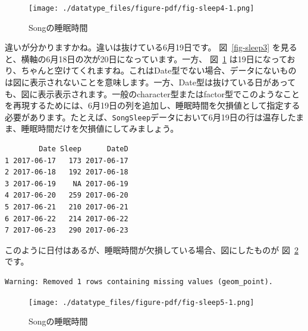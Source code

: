 \documentclass[
  a4paper,
  pandoc,
  ja=standard,
  jafont=haranoaji]{bxjsbook}
\newenvironment{Shaded}{\begin{snugshade}}{\end{snugshade}}
\newcommand{\ConstantTok}[1]{\textcolor[rgb]{0.56,0.35,0.01}{#1}}
\newcommand{\NormalTok}[1]{\textcolor[rgb]{0.00,0.48,0.65}{#1}}
\newcommand{\OtherTok}[1]{\textcolor[rgb]{0.00,0.48,0.65}{#1}}
\newcommand{\SpecialCharTok}[1]{\textcolor[rgb]{0.37,0.37,0.37}{#1}}
\newcommand{\StringTok}[1]{\textcolor[rgb]{0.13,0.47,0.30}{#1}}
\begin{document}
\begin{figure}

{\centering \texttt{[image: ./datatype\_files/figure-pdf/fig-sleep4-1.png]}

}

\caption{\label{fig-sleep4}Songの睡眠時間}

\end{figure}

違いが分かりますかね。違いは抜けている6月19日です。 図~\ref{fig-sleep3}
を見ると、横軸の6月18日の次が20日になっています。一方、
図~\ref{fig-sleep4}
は19日になっており、ちゃんと空けてくれますね。これはDate型でない場合、データにないものは図に表示されないことを意味します。一方、Date型は抜けている日があっても、図に表示表示されます。一般のcharacter型またはfactor型でこのようなことを再現するためには、6月19日の列を追加し、睡眠時間を欠損値として指定する必要があります。たとえば、\texttt{SongSleep}データにおいて6月19日の行は温存したまま、睡眠時間だけを欠損値にしてみましょう。

\begin{Shaded}
\end{Shaded}

\begin{verbatim}
        Date Sleep      DateD
1 2017-06-17   173 2017-06-17
2 2017-06-18   192 2017-06-18
3 2017-06-19    NA 2017-06-19
4 2017-06-20   259 2017-06-20
5 2017-06-21   210 2017-06-21
6 2017-06-22   214 2017-06-22
7 2017-06-23   290 2017-06-23
\end{verbatim}

このように日付はあるが、睡眠時間が欠損している場合、図にしたものが
図~\ref{fig-sleep5} です。

\begin{verbatim}
Warning: Removed 1 rows containing missing values (geom_point).
\end{verbatim}

\begin{figure}

{\centering \texttt{[image: ./datatype\_files/figure-pdf/fig-sleep5-1.png]}

}

\caption{\label{fig-sleep5}Songの睡眠時間}

\end{figure}
\end{document}
